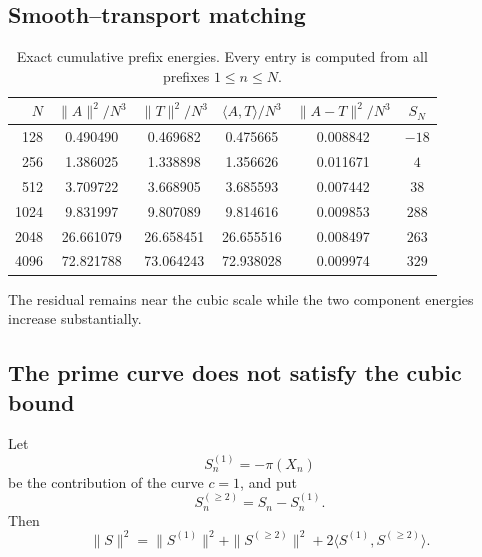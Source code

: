 \documentclass[11pt]{article}
\theoremstyle{definition}
\theoremstyle{remark}
\newcommand{\1}{\mathbf{1}}
\begin{document}
\subsection{Smooth--transport matching}

\begin{table}[htbp]
\centering
\caption{Exact cumulative prefix energies.  Every entry is computed
from all prefixes $1\le n\le N$.}
\label{tab:prefix-energy-numerical}
\scriptsize
\setlength{\tabcolsep}{4.2pt}
\begin{tabular}{rccccc}
\toprule
$N$ &
$\|A\|^2/N^3$ &
$\|T\|^2/N^3$ &
$\langle A,T\rangle/N^3$ &
$\|A-T\|^2/N^3$ &
$S_N$\\
\midrule
128  & 0.490490 & 0.469682 & 0.475665 & 0.008842 & $-18$\\
256  & 1.386025 & 1.338898 & 1.356626 & 0.011671 & $4$\\
512  & 3.709722 & 3.668905 & 3.685593 & 0.007442 & $38$\\
1024 & 9.831997 & 9.807089 & 9.814616 & 0.009853 & $288$\\
2048 & 26.661079 & 26.658451 & 26.655516 & 0.008497 & $263$\\
4096 & 72.821788 & 73.064243 & 72.938028 & 0.009974 & $329$\\
\bottomrule
\end{tabular}
\end{table}

The residual remains near the cubic scale while the two component
energies increase substantially.

\subsection{The prime curve does not satisfy the cubic bound}

Let
\[
 S_n^{(1)}=-\pi(X_n)
\]
be the contribution of the curve $c=1$, and put
\[
 S_n^{(\ge2)}=S_n-S_n^{(1)}.
\]
Then
\begin{equation}
 \|S\|^2
 =
 \|S^{(1)}\|^2
 +
 \|S^{(\ge2)}\|^2
 +
 2\langle S^{(1)},S^{(\ge2)}\rangle.
 \label{eq:prime-rest-energy}
\end{equation}
\end{document}
